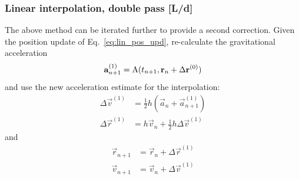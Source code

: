 \documentclass[Orbiter Technical Reference.tex]{subfiles}
\begin{document}
\subsubsection{Linear interpolation, double pass [L/d]}
The above method can be iterated further to provide a second correction. Given the position update of Eq.~\ref{eq:lin_pos_upd}, re-calculate the gravitational acceleration
\begin{equation*}
\mathbf{a}_{n+1}^{(1)} = \mathrm{A}(t_{n+1},\mathbf{r}_n+\Delta\mathbf{r}^{(0)})
\end{equation*}
and use the new acceleration estimate for the interpolation:
\begin{equation*}
\begin{split}
\Delta\vec{v}^{(1)} &= \frac{1}{2}h (\vec{a}_n+\vec{a}_{n+1}^{(1)}) \\
\Delta\vec{r}^{(1)} &= h\vec{v}_n + \frac{1}{2}h\Delta\vec{v}^{(1)}
\end{split}
\end{equation*}
and
\begin{equation*}
\begin{split}
\vec{r}_{n+1} &= \vec{r}_n + \Delta\vec{r}^{(1)} \\
\vec{v}_{n+1} &= \vec{v}_n + \Delta\vec{v}^{(1)}
\end{split}
\end{equation*}
\end{document}
